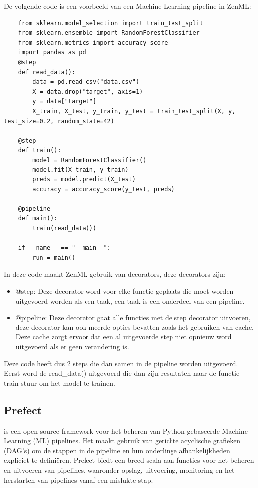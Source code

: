 De volgende code is een voorbeeld van een Machine Learning pipeline in ZenML:

\begin{verbatim}
    from sklearn.model_selection import train_test_split
    from sklearn.ensemble import RandomForestClassifier
    from sklearn.metrics import accuracy_score
    import pandas as pd
    @step
    def read_data():
        data = pd.read_csv("data.csv")
        X = data.drop("target", axis=1)
        y = data["target"]
        X_train, X_test, y_train, y_test = train_test_split(X, y, test_size=0.2, random_state=42)

    @step    
    def train():
        model = RandomForestClassifier()
        model.fit(X_train, y_train)
        preds = model.predict(X_test)
        accuracy = accuracy_score(y_test, preds)
    
    @pipeline
    def main():
        train(read_data())

    if __name__ == "__main__":
        run = main()
\end{verbatim}
In deze code maakt ZenML gebruik van decorators, deze decorators zijn:
\begin{itemize}
    \item @step: Deze decorator word voor elke functie geplaats die moet worden uitgevoerd worden als een taak, een taak is een onderdeel van een pipeline.
    \item @pipeline: Deze decorator gaat alle functies met de step decorator uitvoeren, deze decorator kan ook meerde opties bevatten zoals het gebruiken van cache. Deze cache zorgt ervoor dat een al uitgevoerde step niet opnieuw word uitgevoerd als er geen verandering is.
\end{itemize}

Deze code heeft dus 2 steps die dan samen in de pipeline worden uitgevoerd. Eerst word de read_data() uitgevoerd die dan zijn resultaten naar de functie train stuur om het model te trainen.
\subsection{Prefect}

\textcite{Prefect2024} is een open-source framework voor het beheren van Python-gebaseerde Machine Learning (ML) pipelines. Het maakt gebruik van gerichte acyclische grafieken (DAG's) om de stappen in de pipeline en hun onderlinge afhankelijkheden expliciet te definiëren. Prefect biedt een breed scala aan functies voor het beheren en uitvoeren van pipelines, waaronder opslag, uitvoering, monitoring en het herstarten van pipelines vanaf een mislukte stap.

